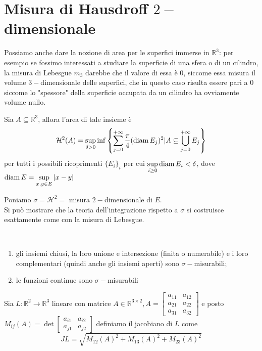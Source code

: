 \section{Misura di Hausdroff $2-$dimensionale}

Possiamo anche dare la nozione di area per le superfici immerse in $\mathbb{R}^3$: per esempio se fossimo interessati a studiare la superficie di una sfera o di un cilindro, la misura di Lebesgue $m_3$ darebbe che il valore di essa è $0$, siccome essa misura
il volume $3-$dimensionale delle superfici, che in questo caso risulta essere pari a $0$ siccome lo "spessore" della superficie occupata da un cilindro ha ovviamente volume nullo. \\
\begin{definition}
	Sia $A \subseteq \mathbb{R}^3$, allora l'area di tale insieme è
	$$
		\mathcal{H}^2(A) = \sup_{\delta > 0} \inf \left\{ \sum_{j=0}^{+\infty} \frac{\pi}{4} (\operatorname{diam} E_j)^2 | A \subseteq \bigcup_{j=0}^{+\infty} E_j \right\}
	$$
	per tutti i possibili ricoprimenti $\{ E_i \}_i$ per cui $\sup\limits_{i \geq 0} \operatorname{diam} E_i < \delta$, dove $\operatorname{diam} E = \sup\limits_{x, y \in E} |x-y|$
\end{definition}
Poniamo $\sigma=\mathcal{H}^2=$ misura $2-$dimensionale di $E$. \\
Si può mostrare che la teoria dell'integrazione rispetto a $\sigma$ si costruisce esattamente come con la misura di Lebesgue. 
\begin{theorem}[teorema A1] \hspace{1cm} \\
	\begin{enumerate}[label=\protect\circled{\arabic*}]
		\item gli insiemi chiusi, la loro unione e intersezione (finita o numerabile) e i loro complementari (quindi anche gli insiemi aperti) sono $\sigma-$misurabili;
		\item le funzioni continue sono $\sigma-$misurabili
	\end{enumerate}
\end{theorem}
\begin{definition}
Sia $L:\mathbb{R}^2 \to \mathbb{R}^3$ lineare con matrice $A \in \mathbb{R}^{3 \times 2}, A = \begin{bmatrix} a_{11} & a_{12} \\ a_{21} & a_{22} \\ a_{31} & a_{32} \end{bmatrix}$ e posto $M_{ij}(A) = \det \begin{bmatrix} a_{i1} & a_{i2} \\ a_{j1} & a_{j2} \end{bmatrix}$ definiamo
il jacobiano di $L$ come
$$
JL = \sqrt{M_{12}(A)^2 + M_{13}(A)^2 + M_{23}(A)^2}
$$
\end{definition}
